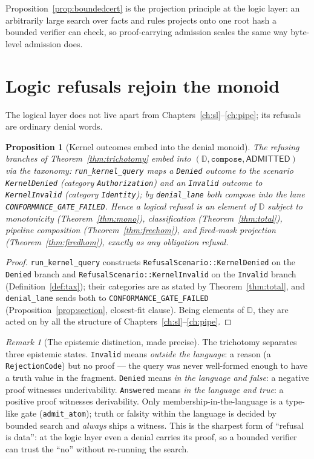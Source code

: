 \documentclass[11pt,oneside]{book}
\theoremstyle{definition}
\theoremstyle{plain}
\newtheorem{proposition}[theorem]{Proposition}
\theoremstyle{remark}
\newtheorem*{remark}{Remark}
\newcommand{\code}[1]{\texttt{#1}}
\newcommand{\Deny}{\mathbb{D}}                 %
\newcommand{\Adml}{\mathsf{ADMITTED}}          %
\begin{document}
Proposition~\ref{prop:boundedcert} is the projection principle at the logic layer: an
arbitrarily large search over facts and rules projects onto one root hash a bounded verifier
can check, so proof-carrying admission scales the same way byte-level admission does.

\section{Logic refusals rejoin the monoid}

The logical layer does not live apart from Chapters~\ref{ch:sl}--\ref{ch:pipe}; its refusals
are ordinary denial words.

\begin{proposition}[Kernel outcomes embed into the denial monoid]\label{prop:embed}
The refusing branches of Theorem~\ref{thm:trichotomy} embed into $(\Deny,\code{compose},\Adml)$
via the taxonomy: \code{run\_kernel\_query} maps a \code{Denied} outcome to the scenario
\code{KernelDenied} (category \code{Authorization}) and an \code{Invalid} outcome to
\code{KernelInvalid} (category \code{Identity}); by \code{denial\_lane} both compose into the
lane \code{CONFORMANCE\_GATE\_FAILED}. Hence a logical refusal is an element of $\Deny$ subject
to monotonicity (Theorem~\ref{thm:mono}), classification (Theorem~\ref{thm:total}), pipeline
composition (Theorem~\ref{thm:freehom}), and fired-mask projection (Theorem~\ref{thm:firedhom}),
exactly as any obligation refusal.
\end{proposition}

\begin{proof}
\code{run\_kernel\_query} constructs \code{RefusalScenario::KernelDenied} on the \code{Denied}
branch and \code{RefusalScenario::KernelInvalid} on the \code{Invalid} branch
(Definition~\ref{def:tax}); their categories are as stated by Theorem~\ref{thm:total}, and
\code{denial\_lane} sends both to \code{CONFORMANCE\_GATE\_FAILED}
(Proposition~\ref{prop:section}, closest-fit clause). Being elements of $\Deny$, they are acted
on by all the structure of Chapters~\ref{ch:sl}--\ref{ch:pipe}. \end{proof}

\begin{remark}[The epistemic distinction, made precise]
The trichotomy separates three epistemic states. \code{Invalid} means \emph{outside the
language}: a reason (a \code{RejectionCode}) but no proof --- the query was never well-formed
enough to have a truth value in the fragment. \code{Denied} means \emph{in the language and
false}: a negative proof witnesses underivability. \code{Answered} means \emph{in the language
and true}: a positive proof witnesses derivability. Only membership-in-the-language is a
type-like gate (\code{admit\_atom}); truth or falsity within the language is decided by bounded
search and \emph{always} ships a witness. This is the sharpest form of ``refusal is data'': at
the logic layer even a denial carries its proof, so a bounded verifier can trust the ``no''
without re-running the search.
\end{remark}
\end{document}
